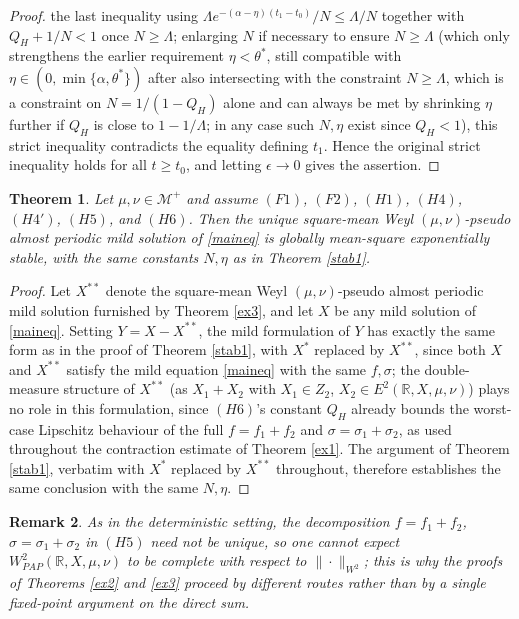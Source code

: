 \documentclass[11pt]{amsart}
\newtheorem{theorem}{Theorem}[section]
\newtheorem{remark}[theorem]{Remark}
\begin{document}
\begin{proof}
the last inequality using $\Lambda e^{-(\alpha-\eta)(t_1-t_0)}/N\le\Lambda/N$ together with $Q_H+1/N<1$ once $N\ge\Lambda$; enlarging $N$ if necessary to ensure $N\ge\Lambda$ (which only strengthens the earlier requirement $\eta<\theta^\ast$, still compatible with $\eta\in(0,\min\{\alpha,\theta^\ast\})$ after also intersecting with the constraint $N\ge\Lambda$, which is a constraint on $N=1/(1-Q_H)$ alone and can always be met by shrinking $\eta$ further if $Q_H$ is close to $1-1/\Lambda$; in any case such $N,\eta$ exist since $Q_H<1$), this strict inequality contradicts the equality defining $t_1$. Hence the original strict inequality holds for all $t\ge t_0$, and letting $\epsilon\to0$ gives the assertion.
\end{proof}

\begin{theorem}\label{stab2}
Let $\mu,\nu\in\mathcal M^+$ and assume $(F1)$, $(F2)$, $(H1)$, $(H4)$, $(H4')$, $(H5)$, and $(H6)$. Then the unique square-mean Weyl $(\mu,\nu)$-pseudo almost periodic mild solution of \eqref{maineq} is globally mean-square exponentially stable, with the same constants $N,\eta$ as in Theorem \ref{stab1}.
\end{theorem}

\begin{proof}
Let $X^{\ast\ast}$ denote the square-mean Weyl $(\mu,\nu)$-pseudo almost periodic mild solution furnished by Theorem \ref{ex3}, and let $X$ be any mild solution of \eqref{maineq}. Setting $Y=X-X^{\ast\ast}$, the mild formulation of $Y$ has exactly the same form as in the proof of Theorem \ref{stab1}, with $X^\ast$ replaced by $X^{\ast\ast}$, since both $X$ and $X^{\ast\ast}$ satisfy the mild equation \eqref{maineq} with the same $f,\sigma$; the double-measure structure of $X^{\ast\ast}$ (as $X_1+X_2$ with $X_1\in Z_2$, $X_2\in E^2(\mathbb R,X,\mu,\nu)$) plays no role in this formulation, since $(H6)$'s constant $Q_H$ already bounds the worst-case Lipschitz behaviour of the full $f=f_1+f_2$ and $\sigma=\sigma_1+\sigma_2$, as used throughout the contraction estimate of Theorem \ref{ex1}. The argument of Theorem \ref{stab1}, verbatim with $X^\ast$ replaced by $X^{\ast\ast}$ throughout, therefore establishes the same conclusion with the same $N,\eta$.
\end{proof}

\begin{remark}
As in the deterministic setting, the decomposition $f=f_1+f_2$, $\sigma=\sigma_1+\sigma_2$ in $(H5)$ need not be unique, so one cannot expect $W^2_{PAP}(\mathbb R,X,\mu,\nu)$ to be complete with respect to $\|\cdot\|_{W^2}$; this is why the proofs of Theorems \ref{ex2} and \ref{ex3} proceed by different routes rather than by a single fixed-point argument on the direct sum.
\end{remark}
\end{document}
